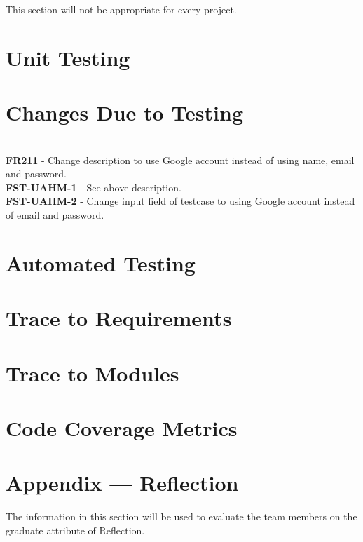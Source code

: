 \documentclass[12pt, titlepage]{article}
\begin{document}
This section will not be appropriate for every project.

\section{Unit Testing}

\section{Changes Due to Testing}

\\
\textbf{FR211} - Change description to use Google account instead of using name, email and password.\\
\textbf{FST-UAHM-1} - See above description. \\
\textbf{FST-UAHM-2} - Change input field of testcase to using Google account instead of email and password. \\

\section{Automated Testing}
		
\section{Trace to Requirements}
		
\section{Trace to Modules}		

\section{Code Coverage Metrics}




\newpage{}
\section*{Appendix --- Reflection}

The information in this section will be used to evaluate the team members on the
graduate attribute of Reflection.
\end{document}
